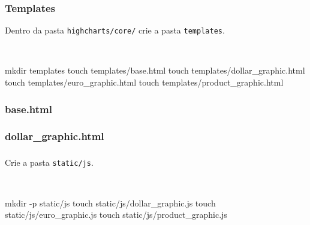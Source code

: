 \documentclass[aspectratio=169]{beamer}
\begin{document}
{\begin{frame}[fragile]\frametitle{Templates}

Dentro da pasta \texttt{highcharts/core/} crie a pasta \texttt{templates}.

\

\begin{bashcode}
mkdir templates
touch templates/base.html
touch templates/dollar_graphic.html
touch templates/euro_graphic.html
touch templates/product_graphic.html
\end{bashcode}

\end{frame}

\begin{frame}[fragile]\frametitle{base.html}
    

\end{frame}

\begin{frame}[fragile]\frametitle{dollar\_graphic.html}


\end{frame}

\begin{frame}[fragile]\frametitle{}

Crie a pasta \texttt{static/js}.

\

\begin{bashcode}
mkdir -p static/js
touch static/js/dollar_graphic.js
touch static/js/euro_graphic.js
touch static/js/product_graphic.js
\end{bashcode}


\end{frame}}
\end{document}
